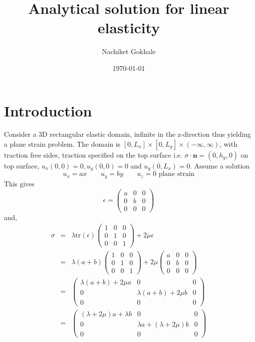 \documentclass[12pt]{article}
\newcommand{\beq}{\begin{equation}}
\newcommand{\eeq}{\end{equation}}
\newcommand{\ber}{\begin{eqnarray}}
\newcommand{\eer}{\end{eqnarray}}
\begin{document}
\title{Analytical solution for linear elasticity}
\date{\today}
\author{Nachiket Gokhale}
\maketitle
\section{Introduction}
Consider a 3D rectangular elastic domain, infinite in the z-direction thus yielding a plane strain problem. The domain is  $[0,L_x]\times[0,L_y]\times(-\infty,\infty)$, with traction free sides, traction specified on the top surface i.e. $\sigma\cdot{\mathbf{n}}=(0,h_y,0)$ on top surface, $u_x(0,0)=0,u_y(0,0)=0$ and $u_y(0,L_x)=0$. Assume a solution
\beq
u_x=ax \qquad u_y = by \qquad u_z = 0\,\, \text{plane strain}
\eeq
This gives
\beq
\epsilon = \begin{pmatrix}a & 0 & 0 \\ 0 & b & 0 \\ 0 & 0 & 0 \end{pmatrix}
\eeq
and,
\ber
\sigma &=& \lambda\text{tr}(\epsilon)\begin{pmatrix}1 & 0 & 0\\ 0 & 1 & 0\\0 & 0 & 1\end{pmatrix} + 2\mu\epsilon \\
  &=& \lambda(a+b)\begin{pmatrix}1 & 0 & 0\\ 0 & 1 & 0\\0 & 0 & 1\end{pmatrix} +  2\mu\begin{pmatrix}a & 0 & 0 \\ 0 & b & 0 \\ 0 & 0 & 0 \end{pmatrix} \\
  &=& \begin{pmatrix}\lambda(a+b)+2\mu{a} & 0 & 0 \\ 0 & \lambda(a+b)+2\mu{b} &0 \\ 0 & 0 & 0\end{pmatrix}  \\
  &=& \begin{pmatrix} (\lambda+2\mu)a + \lambda{b}& 0 & 0\\0 & \lambda{a} + (\lambda+2\mu)b &0 \\ 0 & 0 & 0 \end{pmatrix} 
      \eer
      
\end{document}
